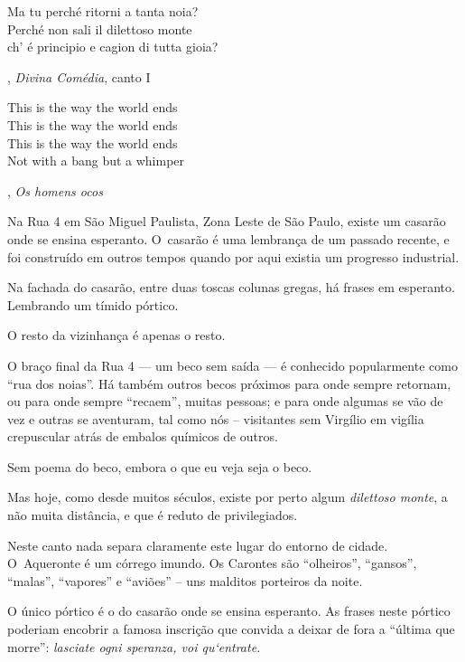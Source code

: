  

\epigraph{Ma tu perché ritorni a tanta noia?\\ Perché non sali il dilettoso
monte\\ ch' é principio e cagion di tutta gioia?}{, \textit{Divina Comédia}, canto I} 



\epigraph{This is the way the world ends\\ This is the way the world ends\\ This
is the way the world ends\\ Not with a bang but a whimper}{, \textit{Os homens ocos}} 

 


Na Rua 4 em São Miguel Paulista, Zona Leste de São Paulo, existe um
casarão onde se ensina esperanto. O~casarão é uma lembrança de um
passado recente, e foi construído em outros tempos quando por aqui
existia um progresso industrial.

Na fachada do casarão, entre duas toscas colunas gregas, há frases em
esperanto. Lembrando um tímido pórtico.

O resto da vizinhança é apenas o resto.

\asterisc{}

O braço final da Rua 4 --- um beco sem saída --- é conhecido
popularmente como ``rua dos noias''. Há também outros becos próximos
para onde sempre retornam, ou para onde sempre ``recaem'', muitas
pessoas; e para onde algumas se vão de vez e outras se aventuram, tal
como nós -- visitantes sem Virgílio em vigília crepuscular atrás de
embalos químicos de outros.

Sem poema do beco, embora o que eu veja seja o beco.

Mas hoje, como desde muitos séculos, existe por perto algum
\emph{dilettoso monte}, a não muita distância, e que é reduto de
privilegiados.

\asterisc{}

Neste canto nada separa claramente este lugar do entorno de cidade. O~Aqueronte é um córrego imundo. Os Carontes são ``olheiros'', ``gansos'',
``malas'', ``vapores'' e ``aviões'' -- uns malditos porteiros da noite.

O único pórtico é o do casarão onde se ensina esperanto. As frases neste
pórtico poderiam encobrir a famosa inscrição que convida a deixar de
fora a ``última que morre'': \emph{lasciate ogni speranza, voi
qu`entrate.}

